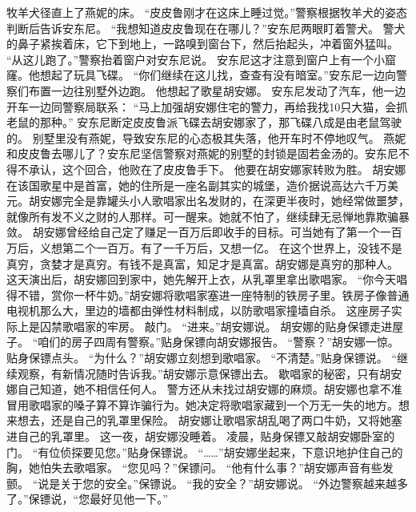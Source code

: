 \documentclass[a4paper,12pt,UTF8,twoside]{ctexbook}
\begin{document}
        牧羊犬径直上了燕妮的床。  
        “皮皮鲁刚才在这床上睡过觉。”警察根据牧羊犬的姿态判断后告诉安东尼。 
        “我想知道皮皮鲁现在在哪儿？”安东尼两眼盯着警犬。 
        警犬的鼻子紧挨着床，它下到地上，一路嗅到窗台下，然后抬起头，冲着窗外猛叫。 
        “从这儿跑了。”警察抬着窗户对安东尼说。 
        安东尼这才注意到窗户上有一个小窟窿。他想起了玩具飞碟。 
        “你们继续在这儿找，查查有没有暗室。”安东尼一边向警察们布置一边往别墅外边跑。 
        他想起了歌星胡安娜。 
        安东尼发动了汽车，他一边开车一边同警察局联系： 
        “马上加强胡安娜住宅的警力，再给我找10只大猫，会抓老鼠的那种。” 
        安东尼断定皮皮鲁派飞碟去胡安娜家了，那飞碟八成是由老鼠驾驶的。 
        别墅里没有燕妮，导致安东尼的心态极其失落，他开车时不停地叹气。 
        燕妮和皮皮鲁去哪儿了？安东尼坚信警察对燕妮的别墅的封锁是固若金汤的。安东尼不得不承认，这个回合，他败在了皮皮鲁手下。 
        他要在胡安娜家转败为胜。 
        胡安娜在该国歌星中是首富，她的住所是一座名副其实的城堡，造价据说高达六千万美元。胡安娜完全是靠罐头小人歌唱家出名发财的，在深更半夜时，她经常做噩梦，就像所有发不义之财的人那样。可一醒来。她就不怕了，继续肆无忌惮地靠欺骗暴敛。 
        胡安娜曾经给自己定了赚足一百万后即收手的目标。可当她有了第一个一百万后，义想第二个一百万。有了一千万后，又想一亿。 
        在这个世界上，没钱不是真穷，贪婪才是真穷。有钱不是真富，知足才是真富。胡安娜是真穷的那种人。 这天演出后，胡安娜回到家中，她先解开上衣，从乳罩里拿出歌唱家。 
        “你今天唱得不错，赏你一杯牛奶。”胡安娜将歌唱家塞进一座特制的铁房子里。铁房子像普通电视机那么大，里边的墙都由弹性材料制成，以防歌唱家撞墙自杀。 
        这座房子实际上是囚禁歌唱家的牢房。 
        敲门。 
        “进来。”胡安娜说。 
        胡安娜的贴身保镖走进屋子。 
        “咱们的房子四周有警察。”贴身保镖向胡安娜报告。 
        “警察？”胡安娜一惊。 
        贴身保镖点头。 
        “为什么？”胡安娜立刻想到歌唱家。 
        “不清楚。”贴身保镖说。 
        “继续观察，有新情况随时告诉我。”胡安娜示意保镖出去。 
        歇唱家的秘密，只有胡安娜自己知道，她不相信任何人。 
        警方还从未找过胡安娜的麻烦。胡安娜也拿不准冒用歌唱家的嗓子算不算诈骗行为。她决定将歌唱家藏到一个万无一失的地方。想来想去，还是自己的乳罩里保险。 
        胡安娜让歌唱家胡乱喝了两口牛奶，又将她塞进自己的乳罩里。 
        这一夜，胡安娜没睡着。 
        凌晨，贴身保镖又敲胡安娜卧室的门。 
        “有位侦探要见您。”贴身保镖说。 
        “……”胡安娜坐起来，下意识地护住自己的胸，她怕失去歌唱家。 
        “您见吗？”保镖问。 
        “他有什么事？”胡安娜声音有些发颤。 
        “说是关于您的安全。”保镖说。 
        “我的安全？”胡安娜说。 
        “外边警察越来越多了。”保镖说，“您最好见他一下。” 
\end{document}
